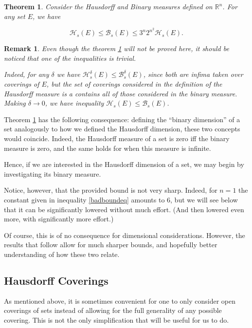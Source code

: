 \documentclass[11pt, reqno]{amsart}
\newcommand{\R}{\mathbb{R}}
\newcommand{\HH}{\mathcal{H}}
\newcommand{\BB}{\mathcal{B}}
\newtheorem{theorem}{Theorem}
\newtheorem{remark}{Remark}
\begin{document}
\begin{theorem}\label{badbound}
Consider the Hausdorff and Binary measures defined on $\R^n$. For any set $E$, we have

\begin{equation}\label{badboundeq}
\HH_s(E) \leq \BB_s(E) \leq 3^n 2^{n^2} \HH_s(E).
\end{equation}
\end{theorem}

\begin{remark}
Even though the theorem \ref{badbound} will not be proved here, it should be noticed that one of the inequalities is trivial.

Indeed, for any $\delta$ we have $\HH_s^\delta(E) \leq \BB_s^\delta(E)$, since both are infima taken over coverings of $E$, but the set of coverings considered in the definition of the Hausdorff measure is a contains all of those considered in the binary measure. Making $\delta \to 0$, we have inequality $\HH_s(E) \leq \BB_s(E)$.
\end{remark}

Theorem \ref{badbound} has the following consequence: defining the ``binary dimension'' of a set analogously to how we defined the Hausdorff dimension, these two concepts would coincide. Indeed, the Hausdorff measure of a set is zero iff the binary measure is zero, and the same holds for when this measure is infinite.

Hence, if we are interested in the Hausdorff dimension of a set, we may begin by investigating its binary measure.

Notice, however, that the provided bound is not very sharp. Indeed, for $n = 1$ the constant given in inequality \eqref{badboundeq} amounts to 6, but we will see below that it can be significantly lowered without much effort. (And then lowered even more, with significantly more effort.)

Of course, this is of no consequence for dimensional considerations. However, the results that follow allow for much sharper bounds, and hopefully better understanding of how these two relate.

\subsection{Hausdorff Coverings}

As mentioned above, it is sometimes convenient for one to only consider open coverings of sets instead of allowing for the full generality of any possible covering. This is not the only simplification that will be useful for us to do.
\end{document}
